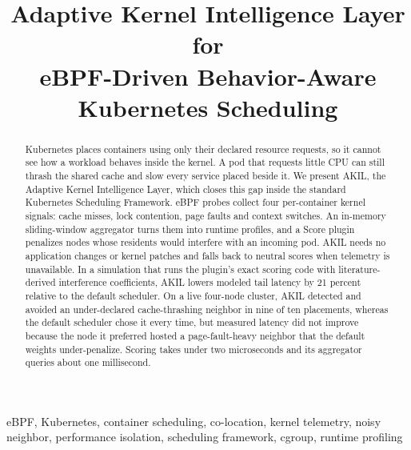 \documentclass[10pt,conference,a4paper]{IEEEtran}
\begin{document}
\title{Adaptive Kernel Intelligence Layer for\\
       eBPF-Driven Behavior-Aware Kubernetes Scheduling}

\author{
}

\maketitle

\begin{abstract}
Kubernetes places containers using only their declared resource requests, so it cannot
see how a workload behaves inside the kernel. A pod that requests little CPU can still
thrash the shared cache and slow every service placed beside it. We present AKIL, the
Adaptive Kernel Intelligence Layer, which closes this gap inside the standard Kubernetes
Scheduling Framework. eBPF probes collect four per-container kernel signals: cache misses,
lock contention, page faults and context switches. An in-memory sliding-window aggregator
turns them into runtime profiles, and a Score plugin penalizes nodes whose residents would
interfere with an incoming pod. AKIL needs no application changes or kernel patches and
falls back to neutral scores when telemetry is unavailable. In a simulation that runs the
plugin's exact scoring code with literature-derived interference coefficients, AKIL lowers
modeled tail latency by 21 percent relative to the default scheduler. On a live four-node
cluster, AKIL detected and avoided an under-declared cache-thrashing neighbor in nine of
ten placements, whereas the default scheduler chose it every time, but measured latency
did not improve because the node it preferred hosted a page-fault-heavy neighbor that the
default weights under-penalize. Scoring takes under two microseconds and its aggregator
queries about one millisecond.
\end{abstract}

\begin{IEEEkeywords}
eBPF, Kubernetes, container scheduling, co-location, kernel telemetry, noisy neighbor,
performance isolation, scheduling framework, cgroup, runtime profiling
\end{IEEEkeywords}
\end{document}
